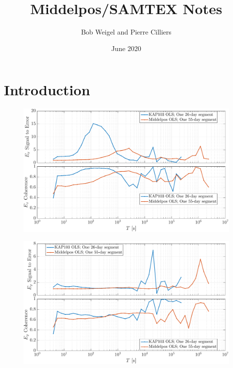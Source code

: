 \documentclass{article}
\title{Middelpos/SAMTEX Notes}
\author{Bob Weigel and Pierre Cilliers}
\date{June 2020}
\begin{document}
\maketitle

\section{Introduction}

\begin{figure}[h!]
\centering
\includegraphics[width=\textwidth]{figures/SN-E_x.pdf}
\caption{}
\label{fig:universe}
\end{figure}

\begin{figure}[h!]
\centering
\includegraphics[width=\textwidth]{figures/SN-E_y.pdf}
\caption{}
\label{fig:universe}
\end{figure}

\end{document}

